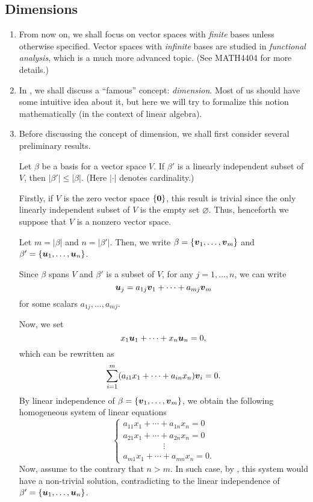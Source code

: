 \subsection{Dimensions}
\label{subsect:dim}
\begin{enumerate}
\item From now on, we shall focus on vector spaces with \emph{finite} bases
unless otherwise specified. Vector spaces with \emph{infinite} bases are
studied in \emph{functional analysis}, which is a much more advanced topic.
(See MATH4404 for more details.)

\item In , we shall discuss a ``famous'' concept:
\emph{dimension}. Most of us should have some intuitive idea about it, but here
we will try to formalize this notion mathematically (in the context of linear
algebra).

\item Before discussing the concept of dimension, we shall first consider
several preliminary results.

\begin{proposition}
\label{prp:li-num-leq-dim}
Let \(\beta\) be a basis for a vector space \(V\). If \(\beta'\) is a
linearly independent subset of \(V\), then \(|\beta'|\le |\beta|\). (Here
\(|\cdot|\) denotes cardinality.)
\end{proposition}
\begin{pf}
Firstly, if \(V\) is the zero vector space \(\{\vb*{0}\}\), this result is
trivial since the only linearly independent subset of \(V\) is the empty set
\(\varnothing\). Thus, henceforth we suppose that \(V\) is a nonzero vector
space.

Let \(m=|\beta|\) and \(n=|\beta'|\). Then, we write
\(\beta=\{\vb*{v}_1,\dotsc,\vb*{v}_m\}\) and
\(\beta'=\{\vb*{u}_1,\dotsc,\vb*{u}_n\}\).

Since \(\beta\) spans \(V\) and \(\beta'\) is a subset of \(V\), for any
\(j=1,\dotsc,n\), we can write
\[
\vb*{u}_j=a_{1j}\vb*{v}_1+\dotsb+a_{mj}\vb*{v}_m
\]
for some scalars \(a_{1j},\dotsc,a_{mj}\).

Now, we set
\[
x_1\vb*{u}_1+\dotsb+x_n\vb*{u}_n=0,
\]
which can be rewritten as
\[
\sum_{i=1}^{m}(a_{i1}x_1+\dotsb+a_{in}x_n)\vb*{v}_i=0.
\]
By linear independence of \(\beta=\{\vb*{v}_1,\dotsc,\vb*{v}_m\}\), we
obtain the following homogeneous system of linear equations
\[
\begin{cases}
a_{11}x_{1}+\dotsb+a_{1n}x_{n}=0\\
a_{21}x_{1}+\dotsb+a_{2n}x_{n}=0\\
\hspace{2cm}\vdots\\
a_{m1}x_1+\dotsb+a_{mn}x_n=0.
\end{cases}
\]
Now, assume to the contrary that \(n>m\). In such case, by
, this system would have a non-trivial
solution, contradicting to the linear independence of
\(\beta'=\{\vb*{u}_1,\dotsc,\vb*{u}_n\}\).
\end{pf}


\end{enumerate}
